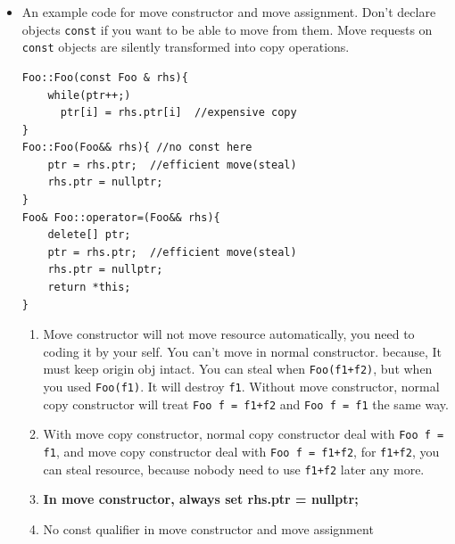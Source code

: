 \documentclass[a4paper,11pt,twoside]{book}
\begin{document}
\begin{itemize}
	
	\item An example code for move constructor and move assignment.	Don't declare objects \texttt{const} if you want to be able to move from them. Move requests on \texttt{const} objects are silently transformed into copy operations.
	
\begin{lstlisting}[numbers=none]
Foo::Foo(const Foo & rhs){
	while(ptr++;)
	  ptr[i] = rhs.ptr[i]  //expensive copy
}
Foo::Foo(Foo&& rhs){ //no const here
	ptr = rhs.ptr;  //efficient move(steal)
	rhs.ptr = nullptr;
}
Foo& Foo::operator=(Foo&& rhs){
	delete[] ptr;
	ptr = rhs.ptr;  //efficient move(steal)
	rhs.ptr = nullptr;
	return *this;
}
\end{lstlisting}
	
	\begin{enumerate}
		\item Move constructor will not move resource automatically, you need to coding it by your self. You can't move in normal constructor. because, It must keep origin obj intact.  You can steal when \texttt{Foo(f1+f2)}, but when you used \texttt{Foo(f1)}.  It will destroy \texttt{f1}. Without  move constructor, normal copy constructor will treat \texttt{Foo f = f1+f2} and \texttt{Foo f = f1} the same way.
		
		\item With move copy constructor, normal copy constructor deal with \texttt{Foo f = f1}, and move copy constructor deal with \texttt{Foo f = f1+f2}, for \texttt{f1+f2}, you can steal resource, because nobody need to use \texttt{f1+f2} later any more. \item \textbf{In move constructor, always set rhs.ptr = nullptr;} \item No const qualifier in move constructor and move assignment
		
	\end{enumerate}
	
%	
%		
%	



\end{itemize}
\end{document}
